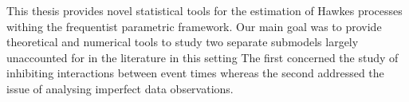 
This thesis provides novel statistical tools for the estimation of Hawkes processes withing the frequentist parametric framework.
Our main goal %
was to provide theoretical and numerical tools to study two separate submodels largely unaccounted for in the literature in this setting
The first concerned the study of inhibiting interactions between event times whereas the second addressed the issue of analysing imperfect data observations.

